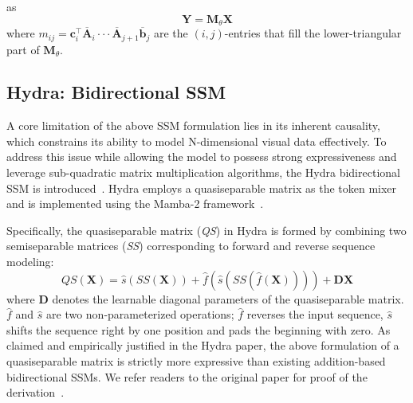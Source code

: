 as
\begin{equation}
    \mathbf{Y}=\mathbf{M}_{\theta}\mathbf{X}
\end{equation}
where $m_{ij}=\mathbf{c}^{\top}_{i}\overline{\mathbf{A}}_{i}\cdot\cdot\cdot\overline{\mathbf{A}}_{j+1}\overline{\mathbf{b}}_{j}$ are the $(i,j)$-entries that fill the lower-triangular part of $\mathbf{M}_{\theta}$.


\subsection{Hydra: Bidirectional SSM}
A core limitation of the above SSM formulation lies in its inherent causality, which constrains its ability to model N-dimensional visual data effectively. To address this issue while allowing the model to possess strong expressiveness and leverage sub-quadratic matrix multiplication algorithms, the Hydra bidirectional SSM is introduced~\citep{hwang2024hydra}. Hydra employs a quasiseparable matrix as the token mixer and is implemented using the Mamba-2 framework~\citep{dao2024mamba2}.

Specifically, the quasiseparable matrix (\textit{QS}) in Hydra is formed by combining two semiseparable matrices (\textit{SS}) corresponding to forward and reverse sequence modeling:
\begin{equation}
    QS(\mathbf{X})=\hat{s}(SS(\mathbf{X}))+\hat{f}(\hat{s}(SS(\hat{f}(\mathbf{X}))))+\mathbf{D}\mathbf{X}
\end{equation}
where $\textbf{D}$ denotes the learnable diagonal parameters of the quasiseparable matrix. $\hat{f}$ and $\hat{s}$ are two non-parameterized operations; $\hat{f}$ reverses the input sequence, $\hat{s}$ shifts the sequence right by one position and pads the beginning with zero. As claimed and empirically justified in the Hydra paper, the above formulation of a quasiseparable matrix is strictly more expressive than existing addition-based bidirectional SSMs. We refer readers to the original paper for proof of the derivation~\citep{hwang2024hydra}.



